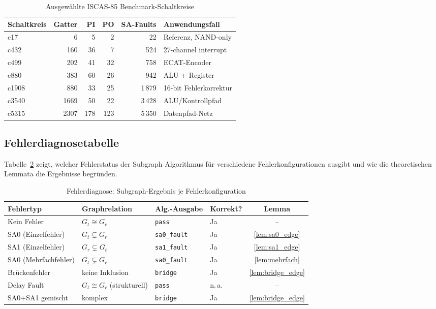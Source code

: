 ﻿\documentclass[a4paper,12pt]{article}
\theoremstyle{definition}
\begin{document}
\begin{table}[ht]
  \centering
  \caption{Ausgewählte ISCAS-85 Benchmark-Schaltkreise}
  \label{tab:iscas}
  \begin{tabular}{lrrrrl}
    \toprule
    \textbf{Schaltkreis} & \textbf{Gatter}
      & \textbf{PI} & \textbf{PO}
      & \textbf{SA-Faults} & \textbf{Anwendungsfall} \\
    \midrule
    c17   &    6 &  5 &  2 &    22 & Referenz, NAND-only \\
    c432  &  160 & 36 &  7 &   524 & 27-channel interrupt \\
    c499  &  202 & 41 & 32 &   758 & ECAT-Encoder \\
    c880  &  383 & 60 & 26 &   942 & ALU + Register \\
    c1908 &  880 & 33 & 25 & 1\,879 & 16-bit Fehlerkorrektur \\
    c3540 & 1669 & 50 & 22 & 3\,428 & ALU/Kontrollpfad \\
    c5315 & 2307 & 178& 123& 5\,350 & Datenpfad-Netz \\
    \bottomrule
  \end{tabular}
\end{table}

\subsection{Fehlerdiagnosetabelle}

Tabelle~\ref{tab:diagnose} zeigt, welcher Fehlerstatus der
Subgraph Algorithmus für verschiedene Fehlerkonfigurationen ausgibt
und wie die theoretischen Lemmata die Ergebnisse begründen.

\begin{table}[ht]
  \centering
  \caption{Fehlerdiagnose: Subgraph-Ergebnis je Fehlerkonfiguration}
  \label{tab:diagnose}
  \small
  \begin{tabular}{@{}llllc@{}}
    \toprule
    \textbf{Fehlertyp} & \textbf{Graphrelation}
      & \textbf{Alg.-Ausgabe} & \textbf{Korrekt?}
      & \textbf{Lemma} \\
    \midrule
    Kein Fehler
      & $G_t \cong G_r$
      & \texttt{pass}
      & Ja & -- \\
    SA0 (Einzelfehler)
      & $G_t \subsetneq G_r$
      & \texttt{sa0\_fault}
      & Ja & \ref{lem:sa0_edge} \\
    SA1 (Einzelfehler)
      & $G_r \subsetneq G_t$
      & \texttt{sa1\_fault}
      & Ja & \ref{lem:sa1_edge} \\
    SA0 (Mehrfachfehler)
      & $G_t \subsetneq G_r$
      & \texttt{sa0\_fault}
      & Ja & \ref{lem:mehrfach} \\
    Brückenfehler
      & keine Inklusion
      & \texttt{bridge}
      & Ja & \ref{lem:bridge_edge} \\
    Delay Fault
      & $G_t \cong G_r$ (strukturell)
      & \texttt{pass}
      & n.\,a. & -- \\
    SA0+SA1 gemischt
      & komplex
      & \texttt{bridge}
      & Ja & \ref{lem:bridge_edge} \\
    \bottomrule
  \end{tabular}
\end{table}
\end{document}
